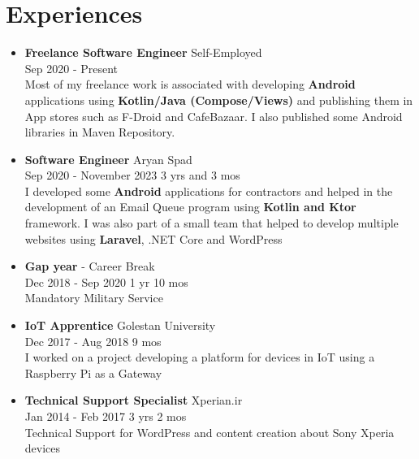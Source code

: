 \section*{\LARGE{Experiences}}
\begin{itemize}
    \item \large{\textbf{Freelance Software Engineer} \hfill Self-Employed\\}
    \normalsize{Sep 2020 - Present\\
    Most of my freelance work is associated with developing \textbf{Android} applications using
    \textbf{Kotlin/Java (Compose/Views)} and publishing them in App stores such as F-Droid and CafeBazaar.
    I also published some Android libraries in Maven Repository.}

    \vspace{1em}

    \item \large{\textbf{Software Engineer} \hfill Aryan Spad\\}
    \normalsize{Sep 2020 - November 2023 \hfill 3 yrs and 3 mos\\I developed some \textbf{Android} applications for contractors
    and helped in the development of an Email Queue program using \textbf{Kotlin and Ktor} framework.
    I was also part of a small team that helped to develop multiple websites using \textbf{Laravel}, .NET Core and WordPress}

    \vspace{1em}

    \item \large{\textbf{Gap year} - Career Break\\}\normalsize{Dec 2018 - Sep 2020 \hfill 1 yr 10 mos\\ Mandatory Military Service}

    \vspace{1em}

    \item \large{\textbf{IoT Apprentice} \hfill Golestan University\\}
    \normalsize{Dec 2017 - Aug 2018 \hfill 9 mos\\I worked on a project developing a platform for devices in IoT using a Raspberry Pi as a Gateway}

    \vspace{1em}

    \item \large{\textbf{Technical Support Specialist} \hfill Xperian.ir\\}
    \normalsize{Jan 2014 - Feb 2017 \hfill 3 yrs 2 mos\\Technical Support for WordPress and content creation about Sony Xperia devices}
\end{itemize}